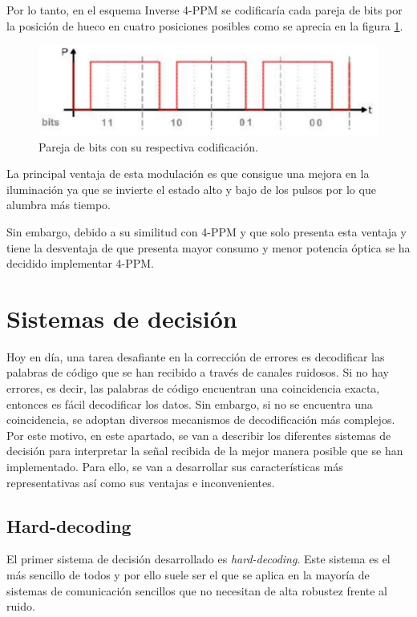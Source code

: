 Por lo tanto, en el esquema Inverse 4-PPM se codificaría cada pareja de bits por la 
posición de hueco en cuatro posiciones posibles como se aprecia en la figura 
\ref{bitsi4ppm}.

\begin{figure}[ht]
    \centering
    \includegraphics[scale=0.5]{./figuras/opcionesI4PPM.png}%
    \caption{\small{Pareja de bits con su respectiva codificación.}}
    \label{bitsi4ppm}%
\end{figure}

La principal ventaja de esta modulación es que consigue una mejora en la iluminación ya que 
se invierte el estado alto y bajo de los pulsos por lo que alumbra más tiempo. 

Sin embargo, debido a su similitud con 4-PPM y que solo presenta esta ventaja y tiene 
la desventaja de que presenta mayor consumo y menor potencia óptica se ha decidido 
implementar 4-PPM.

\section{Sistemas de decisión}
Hoy en día, una tarea desafiante en la corrección de errores es decodificar las palabras 
de código que se han recibido a través de canales ruidosos. Si no hay errores, es decir, 
las palabras de código encuentran una coincidencia exacta, entonces es fácil decodificar 
los datos. Sin embargo, si no se encuentra una coincidencia, se adoptan diversos mecanismos
de decodificación más complejos. Por este motivo,
en este apartado, se van a describir los diferentes sistemas de decisión para interpretar 
la señal recibida de la mejor manera posible que se han implementado. Para ello, se van a
desarrollar sus características más representativas así como sus ventajas e inconvenientes.

\subsection{Hard-decoding}
El primer sistema de decisión desarrollado es \textit{hard-decoding}. Este sistema es 
el más sencillo de todos y por ello suele ser el que se aplica en la mayoría de sistemas
de comunicación sencillos que no necesitan de alta robustez frente al ruido.

